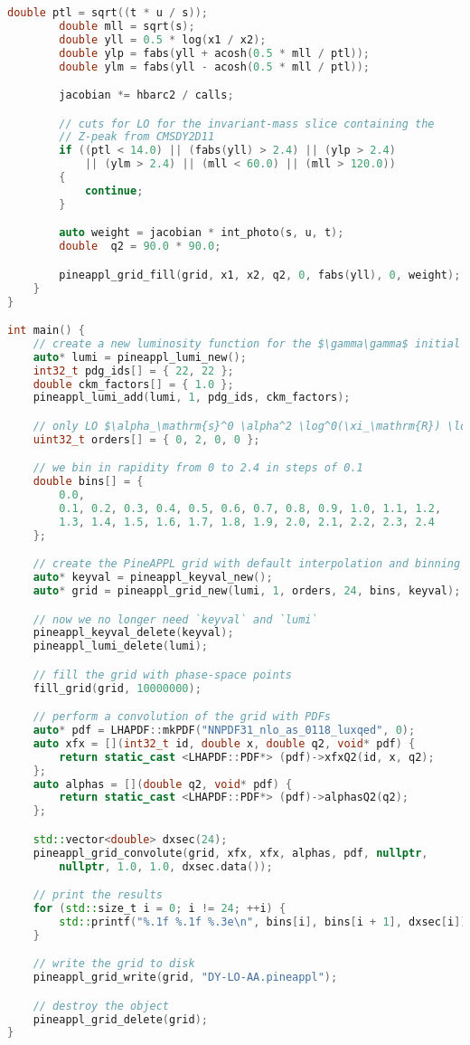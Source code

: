 \begin{lstlisting}[language=C++,mathescape=true]
        double ptl = sqrt((t * u / s));
        double mll = sqrt(s);
        double yll = 0.5 * log(x1 / x2);
        double ylp = fabs(yll + acosh(0.5 * mll / ptl));
        double ylm = fabs(yll - acosh(0.5 * mll / ptl));

        jacobian *= hbarc2 / calls;

        // cuts for LO for the invariant-mass slice containing the
        // Z-peak from CMSDY2D11
        if ((ptl < 14.0) || (fabs(yll) > 2.4) || (ylp > 2.4)
            || (ylm > 2.4) || (mll < 60.0) || (mll > 120.0))
        {
            continue;
        }

        auto weight = jacobian * int_photo(s, u, t);
        double  q2 = 90.0 * 90.0;

        pineappl_grid_fill(grid, x1, x2, q2, 0, fabs(yll), 0, weight);
    }
}

int main() {
    // create a new luminosity function for the $\gamma\gamma$ initial state
    auto* lumi = pineappl_lumi_new();
    int32_t pdg_ids[] = { 22, 22 };
    double ckm_factors[] = { 1.0 };
    pineappl_lumi_add(lumi, 1, pdg_ids, ckm_factors);

    // only LO $\alpha_\mathrm{s}^0 \alpha^2 \log^0(\xi_\mathrm{R}) \log^0(\xi_\mathrm{F})$
    uint32_t orders[] = { 0, 2, 0, 0 };

    // we bin in rapidity from 0 to 2.4 in steps of 0.1
    double bins[] = {
        0.0,
        0.1, 0.2, 0.3, 0.4, 0.5, 0.6, 0.7, 0.8, 0.9, 1.0, 1.1, 1.2,
        1.3, 1.4, 1.5, 1.6, 1.7, 1.8, 1.9, 2.0, 2.1, 2.2, 2.3, 2.4
    };

    // create the PineAPPL grid with default interpolation and binning parameters
    auto* keyval = pineappl_keyval_new();
    auto* grid = pineappl_grid_new(lumi, 1, orders, 24, bins, keyval);

    // now we no longer need `keyval` and `lumi`
    pineappl_keyval_delete(keyval);
    pineappl_lumi_delete(lumi);

    // fill the grid with phase-space points
    fill_grid(grid, 10000000);

    // perform a convolution of the grid with PDFs
    auto* pdf = LHAPDF::mkPDF("NNPDF31_nlo_as_0118_luxqed", 0);
    auto xfx = [](int32_t id, double x, double q2, void* pdf) {
        return static_cast <LHAPDF::PDF*> (pdf)->xfxQ2(id, x, q2);
    };
    auto alphas = [](double q2, void* pdf) {
        return static_cast <LHAPDF::PDF*> (pdf)->alphasQ2(q2);
    };

    std::vector<double> dxsec(24);
    pineappl_grid_convolute(grid, xfx, xfx, alphas, pdf, nullptr,
        nullptr, 1.0, 1.0, dxsec.data());

    // print the results
    for (std::size_t i = 0; i != 24; ++i) {
        std::printf("%.1f %.1f %.3e\n", bins[i], bins[i + 1], dxsec[i]);
    }

    // write the grid to disk
    pineappl_grid_write(grid, "DY-LO-AA.pineappl");

    // destroy the object
    pineappl_grid_delete(grid);
}
\end{lstlisting}


